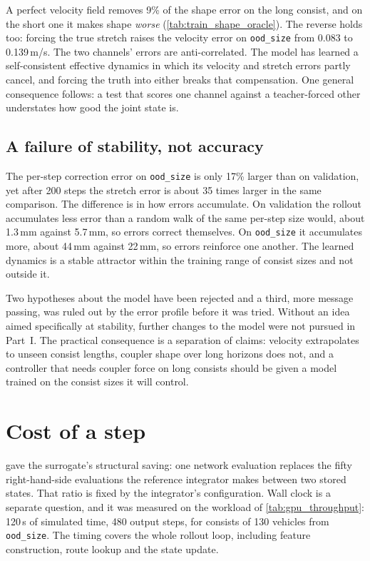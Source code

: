 A perfect velocity field removes 9\% of the shape error on the long consist, and on the short one it makes shape \emph{worse} (\cref{tab:train_shape_oracle}). The reverse holds too: forcing the true stretch raises the velocity error on \texttt{ood\_size} from 0.083 to 0.139\,m/s. The two channels' errors are anti-correlated. The model has learned a self-consistent effective dynamics in which its velocity and stretch errors partly cancel, and forcing the truth into either breaks that compensation. One general consequence follows: a test that scores one channel against a teacher-forced other understates how good the joint state is.

\subsection{A failure of stability, not accuracy}

The per-step correction error on \texttt{ood\_size} is only 17\% larger than on validation, yet after 200 steps the stretch error is about 35 times larger in the same comparison. The difference is in how errors accumulate. On validation the rollout accumulates less error than a random walk of the same per-step size would, about 1.3\,mm against 5.7\,mm, so errors correct themselves. On \texttt{ood\_size} it accumulates more, about 44\,mm against 22\,mm, so errors reinforce one another. The learned dynamics is a stable attractor within the training range of consist sizes and not outside it.

Two hypotheses about the model have been rejected and a third, more message passing, was ruled out by the error profile before it was tried. Without an idea aimed specifically at stability, further changes to the model were not pursued in Part~I. The practical consequence is a separation of claims: velocity extrapolates to unseen consist lengths, coupler shape over long horizons does not, and a controller that needs coupler force on long consists should be given a model trained on the consist sizes it will control.

\section{Cost of a step}
\label{sec:train_cost}

 gave the surrogate's structural saving: one network evaluation replaces the fifty right-hand-side evaluations the reference integrator makes between two stored states. That ratio is fixed by the integrator's configuration. Wall clock is a separate question, and it was measured on the workload of \cref{tab:gpu_throughput}: 120\,s of simulated time, 480 output steps, for consists of 130 vehicles from \texttt{ood\_size}. The timing covers the whole rollout loop, including feature construction, route lookup and the state update.

